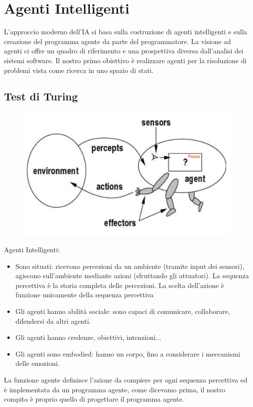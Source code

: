 \documentclass{article}
\begin{document}
\section{Agenti Intelligenti}
L'approccio moderno dell'IA si basa sulla costruzione di agenti intelligenti e sulla creazione del programma agente da parte del programmatore. La visione ad agenti ci offre un quadro di riferimento e una prospettiva diversa dall'analisi dei sistemi software. Il nostro primo obiettivo è realizzare agenti per la risoluzione di problemi vista come ricerca in uno spazio di stati.

\subsection{Test di Turing}
\begin{figure}[H]
    \centering
    \includegraphics[scale=0.3]{Images/AgentiAIMA.png}
\end{figure}
Agenti Intelligenti: 
\begin{itemize}
    \item Sono situati: ricevono percezioni da un ambiente (tramite input dei sensori), agiscono sull'ambiente mediante azioni (sfruttando gli attuatori). La sequenza percettiva è la storia completa delle percezioni. La scelta dell'azione è funzione unicamente della sequenza percettiva
    \item Gli agenti hanno abilità sociale: sono capaci di comunicare, collaborare, difendersi da altri agenti.
    \item Gli agenti hanno credenze, obiettivi, intenzioni...
    \item Gli agenti sono embodied: hanno un corpo, fino a considerare i meccanismi delle emozioni.
\end{itemize}
La funzione agente definisce l’azione da compiere per ogni sequenza percettiva ed è implementata da un programma agente, come dicevamo prima, il nostro compito è proprio quello di progettare il programma agente.
\end{document}
